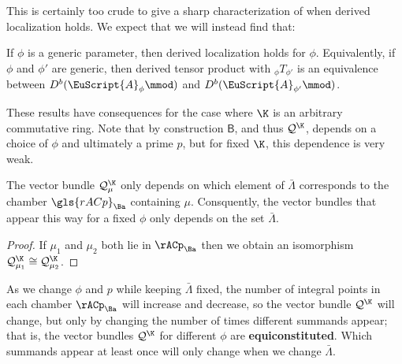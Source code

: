 This is certainly too crude to give a sharp characterization of when derived localization holds.  We expect that we will instead find that:
\begin{conjecture}
If $\phi$ is a generic parameter, then derived localization holds for $\phi$.  Equivalently, if $\phi$ and $\phi'$ are generic, then derived tensor product with ${}_{\phi}T_{\phi'}$ is an equivalence between $D^b(\EuScript{A}_\phi\mmod)$ and $D^b(\EuScript{A}_{\phi'}\mmod)$.
\end{conjecture}

These results have consequences for the case where $\K$ is an arbitrary commutative ring.
Note that by construction $\mathsf{B}$, and thus $\mathcal{Q}^{\K}$, depends on a choice of
$\phi$ and ultimately a prime $p$, but for fixed $\K$, this dependence is very
weak.
\begin{lemma}\label{lem:doesnt-depend2}
  The vector bundle
   $\mathcal{Q}_\mu^{\K}$ only
  depends on which element of $\bar \Lambda$ corresponds to the
  chamber $\gls{rACp}_{\Ba}$ containing $\mu$. Consquently, the vector bundles that appear this way for a fixed $\phi$ only depends on the set $\bar \Lambda$.
\end{lemma}
\begin{proof} If
  $\mu_1$ and $\mu_2$ both lie in $\rACp_{\Ba}$ then we obtain an
  isomorphism $\mathcal{Q}_{\mu_1}^{\K}\cong \mathcal{Q}_{\mu_2}^{\K}$.
\end{proof}
As we change $\phi$ and $p$ while keeping $\bar \Lambda$ fixed, the
number of integral points in each chamber $\rACp_{\Ba}$  will increase and decrease, so the vector
bundle $\mathcal{Q}^{\K}$ will change, but only by changing the
number of times different summands appear; that is, the vector bundles $\mathcal{Q}^{\K}$ for different $\phi$ are {\bf equiconstituted}.  Which summands appear at
least once will only change when we change $\bar \Lambda$.  


